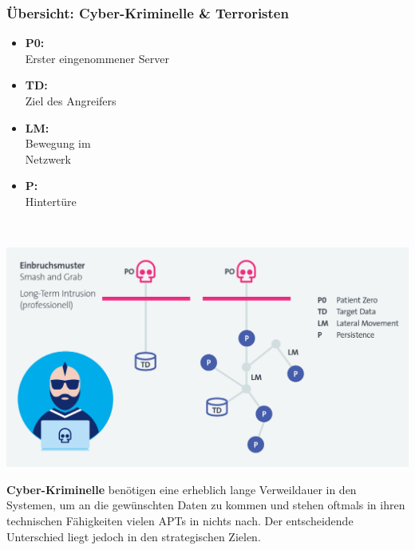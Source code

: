 \subsubsection{Übersicht: Cyber-Kriminelle \& Terroristen}
\begin{minipage}{0.3\linewidth}
    \begin{itemize}
        \item \textbf{P0:}\\ Erster eingenommener Server
        \item \textbf{TD:}\\ Ziel des Angreifers
        \item \textbf{LM:}\\ Bewegung im\\ Netzwerk
        \item \textbf{P:}\\ Hintertüre
    \end{itemize}
    \vfill
    $ $
\end{minipage}
\begin{minipage}{0.7\linewidth}
    \begin{center}
        \includegraphics[width=\linewidth]{./img/01-cyber_defense/cyber_terrorists}
    \end{center}
\end{minipage}

\textbf{Cyber-Kriminelle} benötigen eine erheblich lange Verweildauer in den Systemen, um an die gewünschten Daten zu kommen und stehen oftmals in ihren technischen Fähigkeiten vielen APTs in nichts nach. Der entscheidende
Unterschied liegt jedoch in den strategischen Zielen.


